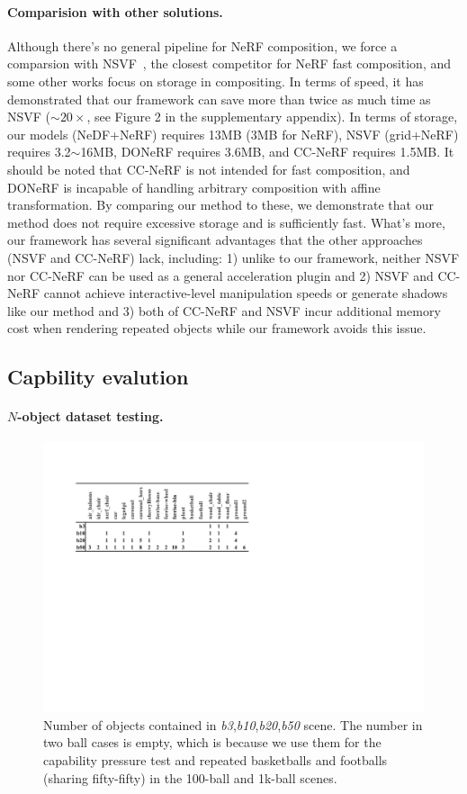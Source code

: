 \documentclass[letterpaper]{article}
\begin{document}
\paragraph{Comparision with other solutions.} Although there's no general pipeline for NeRF composition, we force a comparsion with NSVF~\cite{liu2020neural}, the closest competitor for
NeRF fast composition, and some other works focus on storage in compositing. In terms of speed, it has demonstrated that our framework can save more than twice as much time as NSVF ($\sim 20 \times$, see Figure 2 in the supplementary appendix). In terms of storage, our
models (NeDF+NeRF) requires 13MB (3MB for NeRF), NSVF (grid+NeRF) requires 3.2$\sim$16MB, DONeRF requires 3.6MB, and CC-NeRF requires 1.5MB. It should be noted that CC-NeRF is not intended for fast composition, and DONeRF is incapable of
handling arbitrary composition with affine transformation.
By comparing our method to these, we demonstrate that our method does not require excessive storage and is sufficiently
fast. What's more, our framework has several significant advantages that the other approaches (NSVF and CC-NeRF) lack, including:
1) unlike to our framework, neither NSVF nor CC-NeRF can be used as a general acceleration plugin
and 2) NSVF and CC-NeRF cannot achieve interactive-level manipulation speeds or generate shadows like our method and 3) both of CC-NeRF and NSVF incur additional memory cost when rendering repeated objects while our framework avoids this issue.

\subsection{Capbility evalution}
\paragraph{$N$-object dataset testing.}
\begin{figure}[tbp]
    \centering
    \includegraphics[width=\linewidth]{figure/bx_table.pdf}
    \caption{Number of objects contained in \textit{b3},\textit{b10},\textit{b20},\textit{b50} scene. The number in two ball cases is empty, which is because we use them for the capability pressure test and repeated basketballs and footballs (sharing fifty-fifty) in the 100-ball and 1k-ball scenes.}
    \label{fig:bx_table}
\end{figure}
\end{document}
